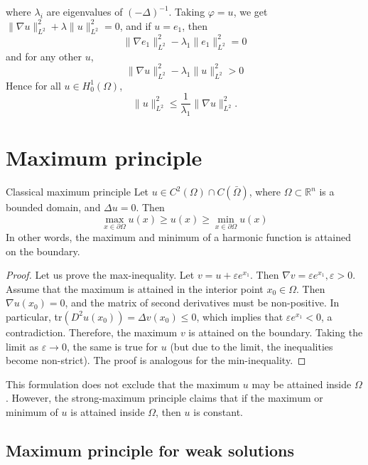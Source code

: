 \documentclass{report}
\begin{document}
\begin{enumerate}
    where \(\lambda_{i}\) are eigenvalues of \((-\Delta)^{-1}\). Taking \(\varphi = u\), we get \(\|\nabla u\|_{L^{2}}^{2} + \lambda\|u\|_{L^{2}}^{2} = 0\), and if \(u = e_{1}\), then 
    \[
        \|\nabla e_{1}\|_{L^{2}}^{2} - \lambda_{1}\|e_{1}\|_{L^{2}}^{2} = 0 
    \]
    and for any other \(u\),
    \[
        \|\nabla u\|_{L^{2}}^{2} - \lambda_{1}\|u\|_{L^{2}}^{2} > 0 
    \] 
    Hence for all \(u \in H^{1}_{0}(\Omega)\),
    \[
        \|u\|_{L^{2}}^{2} \leq \frac{1}{\lambda_{1}} \|\nabla u\|_{L^{2}}^{2}.
    \] 
\end{enumerate}

\section{Maximum principle}
\begin{theorem}{Classical maximum principle}{}
    Let \(u \in C^{2}(\Omega) \cap C(\bar{\Omega})\), where \(\Omega \subset \mathbb{R}^{n}\) is a bounded domain, and \(\Delta u = 0\). Then
    \[
        \max\limits_{x \in \partial \Omega} u(x) \geq u(x) \geq \min\limits_{x \in \partial \Omega} u(x)
    \]
    In other words, the maximum and minimum of a harmonic function is attained on the boundary.
\end{theorem}

\begin{proof}
    Let us prove the max-inequality. Let \(v = u + \varepsilon e^{x_{1}}\). Then \(\nabla v = \varepsilon e^{x_{1}}, \varepsilon > 0\). Assume that the maximum is attained in the interior point \(x_{0} \in \Omega\). Then \(\nabla u(x_{0}) = 0\), and the matrix of second derivatives must be non-positive. In particular, tr\((D^{2}u(x_{0})) = \Delta v(x_{0}) \leq 0\), which implies that \(\varepsilon e^{x_{1}} < 0\), a contradiction. Therefore, the maximum \(v\) is attained on the boundary. Taking the limit as \(\varepsilon \to 0\), the same is true for \(u\) (but due to the limit, the inequalities become non-strict). The proof is analogous for the min-inequality.
\end{proof}
This formulation does not exclude that the maximum \(u\) may be attained inside \(\Omega\). However, the strong-maximum principle claims that if the maximum or minimum of \(u\) is attained inside \(\Omega\), then \(u\) is constant.

\subsection*{Maximum principle for weak solutions}
\end{document}
